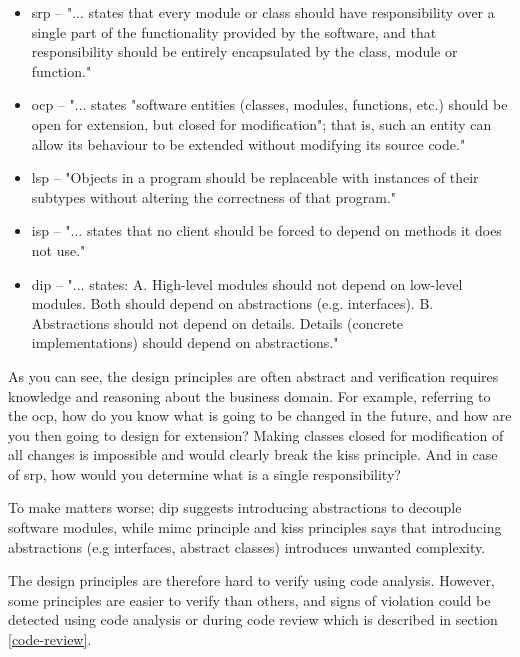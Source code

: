 \documentclass{report}
\begin{document}
\begin{itemize}
    \item \gls{srp} -- "... states that every module or class should have responsibility over a single part of the functionality provided by the software, and that responsibility should be entirely encapsulated by the class, module or function." \cite{srp}
    \item \gls{ocp} -- "... states "software entities (classes, modules, functions, etc.) should be open for extension, but closed for modification"; that is, such an entity can allow its behaviour to be extended without modifying its source code." \cite{ocp}
    \item \gls{lsp} -- "Objects in a program should be replaceable with instances of their subtypes without altering the correctness of that program." \cite{lsp}
    \item \gls{isp} -- "... states that no client should be forced to depend on methods it does not use." \cite{isp}
    \item \gls{dip} --  "... states: \newline A. High-level modules should not depend on low-level modules. Both should depend on abstractions (e.g. interfaces). \newline
B. Abstractions should not depend on details. Details (concrete implementations) should depend on abstractions." \cite{dip}
\end{itemize}
    
As you can see, the design principles are often abstract and verification requires knowledge and reasoning about the business domain. For example, referring to the \gls{ocp}, how do you know what is going to be changed in the future, and how are you then going to design for extension? Making classes closed for modification of all changes is impossible and would clearly break the \gls{kiss} principle. And in case of \gls{srp}, how would you determine what is a single responsibility? 

To make matters worse; \gls{dip} suggests introducing abstractions to decouple software modules, while \gls{mimc} principle and \gls{kiss} principles says that introducing abstractions (e.g interfaces, abstract classes) introduces unwanted complexity.

The design principles are therefore hard to verify using code analysis. However, some principles are easier to verify than others, and signs of violation could be detected using code analysis or during code review which is described in section \ref{code-review}.
\end{document}
